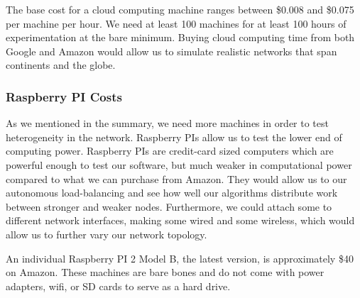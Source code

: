 \documentclass[12pt,a4paper]{article}
\begin{document}
The base cost for a cloud computing machine ranges between \$0.008 and \$0.075 per machine per hour.
We need at least 100 machines for at least 100 hours of experimentation at the bare minimum.
Buying cloud computing time from both Google and Amazon would allow us to simulate realistic networks that span continents and the globe.




\subsubsection*{Raspberry PI Costs}
As we mentioned in the summary, we need more machines in order to test heterogeneity in the network.
Raspberry PIs allow us to test the lower end of computing power.
Raspberry PIs are credit-card sized computers which are powerful enough to test our software, but much weaker in computational power compared to what we can purchase from Amazon.
They would allow us to our autonomous load-balancing and see how well our algorithms distribute work between stronger and weaker nodes.
Furthermore, we could attach some to different network interfaces, making some wired and some wireless, which would allow us to further vary our network topology.

An individual Raspberry PI 2 Model B, the latest version, is approximately \$40 on Amazon.
These machines are bare bones and do not come with power adapters, wifi, or SD cards to serve as a hard drive.
\end{document}
